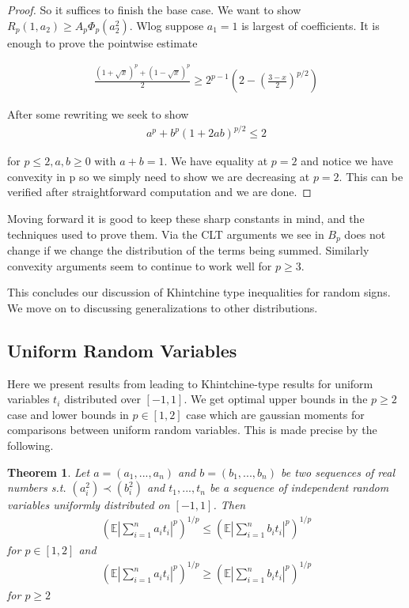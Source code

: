 \documentclass[10pt]{article}
\newcommand{\E}{\mathbb{E}}
\newcommand{\1}{\textbf{1}}
\newtheorem{theorem}{Theorem}
\theoremstyle{remark}
\theoremstyle{definition}
\begin{document}
\begin{proof}
	So it suffices to finish the base case. We want to show $R_p(1,a_2) \geq A_p \Phi_p(a_2^2)$. Wlog suppose $a_1 =1$ is largest of coefficients. It is enough to prove the pointwise estimate

	\begin{align*}
		\frac{(1+\sqrt{x})^p + (1-\sqrt{x})^p}{2} \geq 2^{p-1}(2-(\frac{3-x}{2})^{p/2})
	\end{align*}

	After some rewriting we seek to show
	\begin{align*}
		a^p + b^p (1+2ab)^{p/2} \leq 2
	\end{align*}

	for $p \leq 2, a,b \geq 0$ with $a+b = 1$. We have equality at $p=2$ and notice we have convexity in p so we simply need to show  we are decreasing at $p=2$. This can be verified after straightforward computation and we are done.
\end{proof}

Moving forward it is good to keep these sharp constants in mind, and the techniques used to prove them. Via the CLT arguments we see in $B_p$ does not change if we change the distribution of the terms being summed. Similarly convexity arguments seem to continue to work well for $p \geq 3$. 

This concludes our discussion of Khintchine type inequalities for random signs. We move on to discussing generalizations to other distributions.


\subsection{Uniform Random Variables}

Here we present results from \cite{LO} leading to Khintchine-type results for uniform variables $t_i$ distributed over $[-1,1]$. We get optimal upper bounds in the $p \geq 2$ case and lower bounds in $p \in [1,2]$ case which are gaussian moments for comparisons between uniform random variables. This is made precise by the following.

\begin{theorem}
	Let $a = (a_1,...,a_n)$ and $b=(b_1,...,b_n)$ be two sequences of real numbers s.t. $(a_i^2) \prec (b_i^2)$ and $t_1,...,t_n$ be a sequence of independent random variables uniformly distributed on $[-1,1]$. Then
	\begin{align*}
		(\E |\sum_{i=1}^n a_it_i|^p)^{1/p}\leq (\E |\sum_{i=1}^nb_it_i|^p)^{1/p}
	\end{align*}
	for $p \in [1,2]$ and
	\begin{align*}
		(\E |\sum_{i=1}^n a_it_i|^p)^{1/p} \geq (\E |\sum_{i=1}^n b_it_i|^p)^{1/p}
	\end{align*}
	for $p \geq 2$
\end{theorem}
\end{document}

